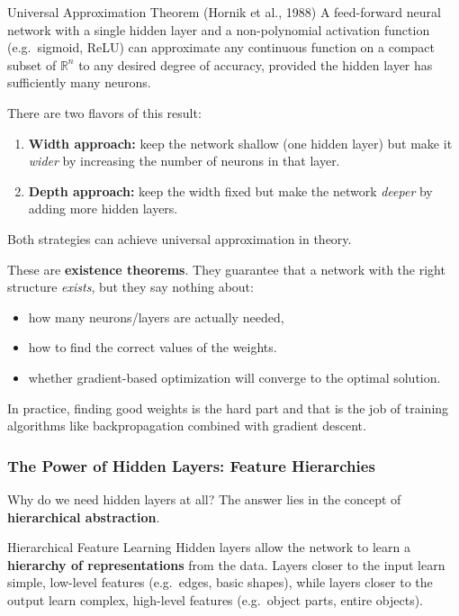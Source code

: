 \documentclass[11pt]{article}
\theoremstyle{smallexample}
\begin{document}
\begin{defbox}{Universal Approximation Theorem (Hornik et al., 1988)}
A feed-forward neural network with a single hidden layer and a non-polynomial activation
function (e.g.\ sigmoid, ReLU) can approximate any continuous function on a compact
subset of $\mathbb{R}^n$ to any desired degree of accuracy, provided the hidden layer has
sufficiently many neurons.
\end{defbox}

There are two flavors of this result:

\begin{enumerate}
    \item \textbf{Width approach:} keep the network shallow (one hidden layer) but make it
          \emph{wider} by increasing the number of neurons in that layer.
    \item \textbf{Depth approach:} keep the width fixed but make the network \emph{deeper}
          by adding more hidden layers.
\end{enumerate}

Both strategies can achieve universal approximation in theory.

These are \textbf{existence theorems}. They guarantee that a network with the right
structure \emph{exists}, but they say nothing about:
\begin{itemize}
    \item how many neurons/layers are actually needed,
    \item how to find the correct values of the weights.
    \item whether gradient-based optimization will converge to the optimal solution.
\end{itemize}

In practice, finding good weights is the hard part and that is the job of training algorithms like backpropagation combined with gradient descent.

\subsubsection{The Power of Hidden Layers: Feature Hierarchies}

Why do we need hidden layers at all? The answer lies in the concept of \textbf{hierarchical
abstraction}.

\begin{defbox}{Hierarchical Feature Learning}
Hidden layers allow the network to learn a \textbf{hierarchy of representations} from the data.
Layers closer to the input learn simple, low-level features (e.g.\ edges, basic shapes),
while layers closer to the output learn complex, high-level features (e.g.\ object parts,
entire objects).
\end{defbox}
\end{document}
